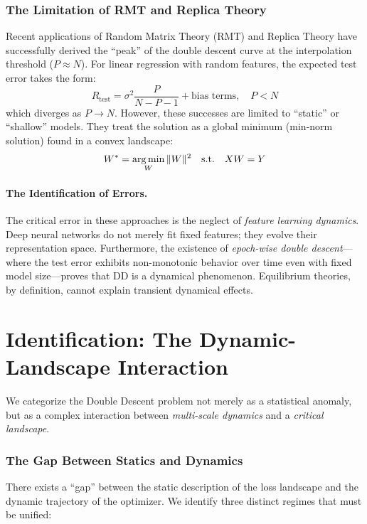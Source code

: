 \subsubsection{The Limitation of RMT and Replica Theory}

Recent applications of Random Matrix Theory (RMT) and Replica Theory have successfully derived the ``peak'' of the double descent curve at the interpolation threshold ($P \approx N$). For linear regression with random features, the expected test error takes the form:
\begin{equation}
    R_{\text{test}} = \sigma^2 \frac{P}{N - P - 1} + \text{bias terms}, \quad P < N
\end{equation}
which diverges as $P \to N$. However, these successes are limited to ``static'' or ``shallow'' models. They treat the solution as a global minimum (min-norm solution) found in a convex landscape:
\begin{equation}
    W^* = \operatorname*{arg\,min}_W \|W\|^2 \quad \text{s.t.} \quad XW = Y
\end{equation}

\paragraph{The Identification of Errors.} The critical error in these approaches is the neglect of \textit{feature learning dynamics}. Deep neural networks do not merely fit fixed features; they evolve their representation space. Furthermore, the existence of \textit{epoch-wise double descent}---where the test error exhibits non-monotonic behavior over time even with fixed model size---proves that DD is a dynamical phenomenon. Equilibrium theories, by definition, cannot explain transient dynamical effects.

\section{Identification: The Dynamic-Landscape Interaction}

We categorize the Double Descent problem not merely as a statistical anomaly, but as a complex interaction between \textit{multi-scale dynamics} and a \textit{critical landscape}.

\subsubsection{The Gap Between Statics and Dynamics}

There exists a ``gap'' between the static description of the loss landscape and the dynamic trajectory of the optimizer. We identify three distinct regimes that must be unified:

